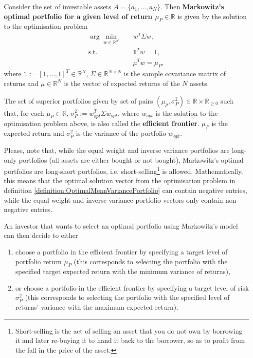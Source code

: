     \begin{definition}\label{definition:OptimalMeanVariancePortfolio}
        Consider the set of investable assets $A = \{ a_1, \dots, a_N \}$. Then \textbf{Markowitz's optimal portfolio for a given level of return $\mu_P \in \mathbb{R}$} is given by the solution to the optimisation problem
        \begin{align*}
            \arg \min_{w \in \mathbb{R}^N}& \quad w^T \Sigma w, \\
            \text{s.t.}& \quad \mathds{1}^T w = 1, \\
            & \quad \mu^T w = \mu_P,
        \end{align*}
        where $\mathds{1} := [ 1, \dots, 1]^T \in \mathbb{R}^N$, $\Sigma \in \mathbb{R}^{N \times N}$ is the sample covariance matrix of returns and $\mu \in \mathbb{R}^N$ is the vector of expected returns of the $N$ assets.
        
        The set of superior portfolios given by set of pairs $(\mu_p, \sigma_P^2) \in \mathbb{R} \times \mathbb{R}_{\geq 0}$ such that, for each $\mu_P \in \mathbb{R}$, $\sigma_P^2 := w_{opt}^T \Sigma w_{opt}$, where $w_{opt}$ is the solution to the optimisation problem above, is also called the \textbf{efficient frontier}. $\mu_P$ is the expected return and $\sigma_P^2$ is the variance of the portfolio $w_{opt}$.
    \end{definition}
    
    Please, note that, while the equal weight and inverse variance portfolios are long-only portfolios (all assets are either bought or not bought), Markowitz's optimal portfolios are long-short portfolios, i.e. short-selling\footnote{Short-selling is the act of selling an asset that you do not own by borrowing it and later re-buying it to hand it back to the borrower, so as to profit from the fall in the price of the asset.\label{Footnote:ShortSelling}} is allowed. Mathematically, this means that the optimal solution vector from the optimisation problem in definition \ref{definition:OptimalMeanVariancePortfolio} can contain negative entries, while the equal weight and inverse variance portfolio vectors only contain non-negative entries.
    
    An investor that wants to select an optimal portfolio using Markowitz's model can then decide to either
    \begin{enumerate}
        \item choose a portfolio in the efficient frontier by specifying a target level of portfolio return $\mu_P$ (this corresponds to selecting the portfolio with the specified target expected return with the minimum variance of returns),
        \item or choose a portfolio in the efficient frontier by specifying a target level of risk $\sigma_P^2$ (this corresponds to selecting the portfolio with the specified level of returns' variance with the maximum expected return).
    \end{enumerate}
    
